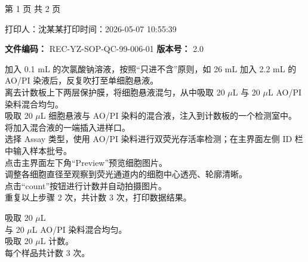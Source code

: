 \documentclass[UTF8,10pt,a4paper,fontset=fandol]{ctexart}
\newcommand{\fieldvalue}[1]{#1}
\newcommand{\handwritten}[1]{#1}
\begin{document}
\begin{center}
第 1 页 共 2 页

\vspace{0.5em}
打印人：沈某某\hspace{2em}打印时间：2026-05-07 10:55:39
\end{center}


\newpage

\noindent
\textbf{文件编码：} REC-YZ-SOP-QC-99-006-01
\hfill
\textbf{版本号：} 2.0

\vspace{0.5em}

\noindent
\begin{minipage}{0.62\linewidth}
加入 0.1 mL 的次氯酸钠溶液，按照“只进不含”原则，如 26 mL 加入 2.2 mL 的 AO/PI 染液后，反复吹打至单细胞悬液。\\
离去计数板上下两层保护膜，将细胞悬液混匀，从中吸取 20 $\mu$L 与 20 $\mu$L AO/PI 染料混合均匀。\\
吸取 20 $\mu$L 细胞悬液与 AO/PI 染料的混合液，注入到计数板的一个检测室中。\\
将加入混合液的一端插入进样口。\\
选择 Assay 类型，使用 AO/PI 染料进行双荧光存活率检测；在主界面左侧 ID 栏中输入样本批号。\\
点击主界面左下角“Preview”预览细胞图片。\\
调整各细胞直径至观察到荧光通道内的细胞中心透亮、轮廓清晰。\\
点击“count”按钮进行计数并自动拍摄图片。\\
重复以上步骤 2 次，共计数 3 次，打印数据结果。
\end{minipage}
\hfill
\begin{minipage}{0.34\linewidth}
吸取
\fieldvalue{\handwritten{20}} $\mu$L\\[0.5em]
与
\fieldvalue{\handwritten{20}} $\mu$L AO/PI 染料混合均匀。\\[0.5em]
吸取
\fieldvalue{\handwritten{20}} $\mu$L 计数。\\[0.5em]
每个样品共计数
\fieldvalue{\handwritten{3}} 次。
\end{minipage}
\end{document}
